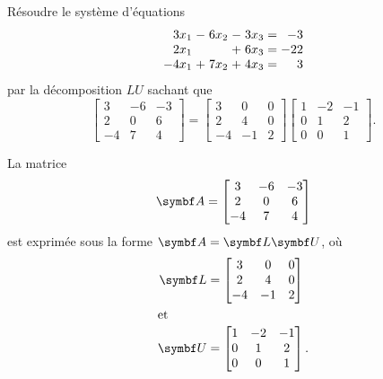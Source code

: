 \begin{exercice}
  Résoudre le système d'équations
  \begin{displaymath}
    \begin{array}[t]{*{2}{r@{\;}c@{\;}}r@{\;=\;}r}
      3x_1 &-& 6x_2 &-& 3x_3 &  -3 \\
      2x_1 & &      &+& 6x_3 & -22 \\
      -4x_1&+& 7x_2 &+& 4x_3 &   3
    \end{array}
  \end{displaymath}
  par la décomposition $LU$ sachant que
  \begin{displaymath}
    \begin{bmatrix}
      3 & -6 & -3 \\ 2 & 0 & 6 \\ -4 & 7 & 4
    \end{bmatrix} =
    \begin{bmatrix}
      3 & 0 & 0 \\ 2 & 4 & 0 \\ -4 & -1 & 2
    \end{bmatrix}
    \begin{bmatrix}
      1 & -2 & -1 \\ 0 & 1 & 2 \\ 0 & 0 & 1
    \end{bmatrix}.
  \end{displaymath}
  \begin{sol}
    La matrice
    \begin{displaymath}
      \mat{A} =
      \begin{bmatrix}
        3 & -6 & -3 \\ 2 & 0 & 6 \\ -4 & 7 & 4
      \end{bmatrix}
    \end{displaymath}
    est exprimée sous la forme $\mat{A} = \mat{L} \mat{U}$, où
    \begin{align*}
      \mat{L}
      &=
      \begin{bmatrix}
        3 & 0 & 0 \\ 2 & 4 & 0 \\ -4 & -1 & 2
      \end{bmatrix} \\
      \intertext{et}
      \mat{U}
      &=
      \begin{bmatrix}
        1 & -2 & -1 \\ 0 & 1 & 2 \\ 0 & 0 & 1
      \end{bmatrix}.

\end{align*}
\end{sol}
\end{exercice}
